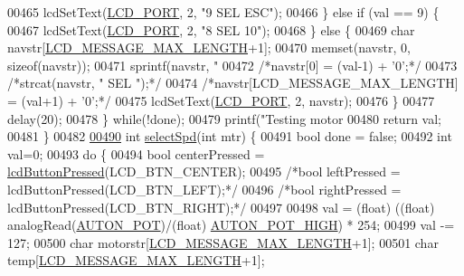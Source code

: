 \begin{DoxyCode}
{{{00465             lcdSetText(\hyperlink{lcdmsg_8h_abcf42bd88b3c36193f301ca25b033875}{LCD\_PORT}, 2, \textcolor{stringliteral}{"9      SEL   ESC"});
00466         \} \textcolor{keywordflow}{else} \textcolor{keywordflow}{if} (val == 9) \{
00467             lcdSetText(\hyperlink{lcdmsg_8h_abcf42bd88b3c36193f301ca25b033875}{LCD\_PORT}, 2, \textcolor{stringliteral}{"8      SEL    10"});
00468         \} \textcolor{keywordflow}{else} \{
00469             \textcolor{keywordtype}{char} navstr[\hyperlink{lcdmsg_8h_abe4c4b70fc6f44ae3680e5b2c68cdd00}{LCD\_MESSAGE\_MAX\_LENGTH}+1];
00470             memset(navstr, 0, \textcolor{keyword}{sizeof}(navstr));
00471             sprintf(navstr, \textcolor{stringliteral}{"%
00472             \textcolor{comment}{/*navstr[0] = (val-1) + '0';*/}
00473             \textcolor{comment}{/*strcat(navstr, "      SEL     ");*/}
00474             \textcolor{comment}{/*navstr[LCD\_MESSAGE\_MAX\_LENGTH] = (val+1) + '0';*/}
00475             lcdSetText(\hyperlink{lcdmsg_8h_abcf42bd88b3c36193f301ca25b033875}{LCD\_PORT}, 2, navstr);
00476         \}
00477         delay(20);
00478     \} \textcolor{keywordflow}{while}(!done);
00479     printf(\textcolor{stringliteral}{"Testing motor %
00480     \textcolor{keywordflow}{return} val;
00481 \}
00482 
\hypertarget{lcddiag_8c_source.tex_l00490}{}\hyperlink{lcddiag_8c_a1f4f4ecd7b0c166456dd26a66e51f813}{00490} \textcolor{keywordtype}{int} \hyperlink{lcddiag_8c_a1f4f4ecd7b0c166456dd26a66e51f813}{selectSpd}(\textcolor{keywordtype}{int} mtr) \{
00491     \textcolor{keywordtype}{bool} done = \textcolor{keyword}{false};
00492     \textcolor{keywordtype}{int} val=0;
00493     \textcolor{keywordflow}{do} \{
00494         \textcolor{keywordtype}{bool} centerPressed = \hyperlink{lcddiag_8h_a74e4c744db49f9b7b645095575e152ad}{lcdButtonPressed}(LCD\_BTN\_CENTER);
00495         \textcolor{comment}{/*bool leftPressed = lcdButtonPressed(LCD\_BTN\_LEFT);*/}
00496         \textcolor{comment}{/*bool rightPressed = lcdButtonPressed(LCD\_BTN\_RIGHT);*/}
00497 
00498         val = (float) ((\textcolor{keywordtype}{float}) analogRead(\hyperlink{autonrecorder_8h_a2490cda7a399f481333af2e5589b74a9}{AUTON\_POT})/(float) 
      \hyperlink{autonrecorder_8h_a01989d89b8bed150d0aacdaef5ccabd3}{AUTON\_POT\_HIGH}) * 254;
00499         val -= 127;
00500         \textcolor{keywordtype}{char} motorstr[\hyperlink{lcdmsg_8h_abe4c4b70fc6f44ae3680e5b2c68cdd00}{LCD\_MESSAGE\_MAX\_LENGTH}+1];
00501         \textcolor{keywordtype}{char} temp[\hyperlink{lcdmsg_8h_abe4c4b70fc6f44ae3680e5b2c68cdd00}{LCD\_MESSAGE\_MAX\_LENGTH}+1];
}}}}}
\end{DoxyCode}
